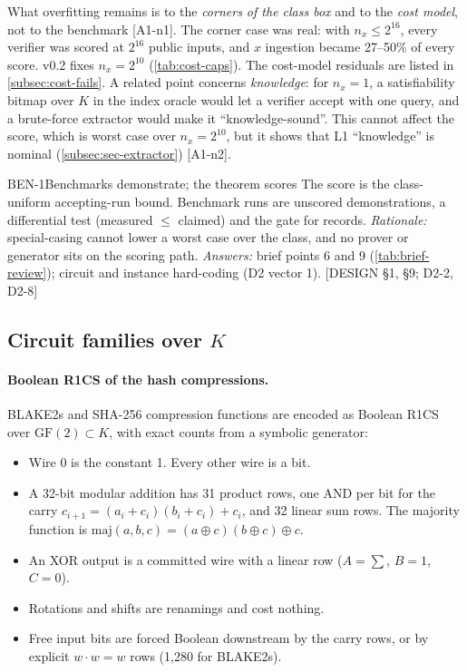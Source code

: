 What overfitting remains is to the \emph{corners of the class box} and to the \emph{cost model}, not
to the benchmark [A1-n1]. The corner case was real: with $n_x\le2^{16}$, every verifier was scored at
$2^{16}$ public inputs, and $x$ ingestion became 27--50\% of every score. v0.2 fixes $n_x=2^{10}$
(\cref{tab:cost-caps}). The cost-model residuals are listed in \cref{subsec:cost-fails}. A related
point concerns \emph{knowledge}: for $n_x=1$, a satisfiability bitmap over $K$ in the index oracle
would let a verifier accept with one query, and a brute-force extractor would make it
\enquote{knowledge-sound}. This cannot affect the score, which is worst case over $n_x=2^{10}$, but it
shows that L1 \enquote{knowledge} is nominal (\cref{subsec:sec-extractor}) [A1-n2].

\begin{decision}{BEN-1}{Benchmarks demonstrate; the theorem scores}
The score is the class-uniform accepting-run bound. Benchmark runs are unscored demonstrations, a
differential test (measured $\le$ claimed) and the gate for records. \emph{Rationale:}
special-casing cannot lower a worst case over the class, and no prover or generator sits on the
scoring path. \emph{Answers:} brief points 6 and 9 (\cref{tab:brief-review}); circuit and instance
hard-coding (D2 vector 1). [DESIGN §1, §9; D2-2, D2-8]
\end{decision}

\subsection{Circuit families over \texorpdfstring{$K$}{K}}\label{subsec:bench-families}

\paragraph{Boolean R1CS of the hash compressions.} BLAKE2s and SHA-256 compression functions are
encoded as Boolean R1CS over $\mathrm{GF}(2)\subset K$, with exact counts from a symbolic generator:
\begin{itemize}[nosep]
\item Wire 0 is the constant 1. Every other wire is a bit.
\item A 32-bit modular addition has 31 product rows, one AND per bit for the carry
  $c_{i+1}=(a_i+c_i)(b_i+c_i)+c_i$, and 32 linear sum rows. The majority function is
  $\mathrm{maj}(a,b,c)=(a\oplus c)(b\oplus c)\oplus c$.
\item An XOR output is a committed wire with a linear row ($A=\sum$, $B=1$, $C=0$).
\item Rotations and shifts are renamings and cost nothing.
\item Free input bits are forced Boolean downstream by the carry rows, or by explicit
  $w\cdot w=w$ rows (1{,}280 for BLAKE2s).
\end{itemize}

